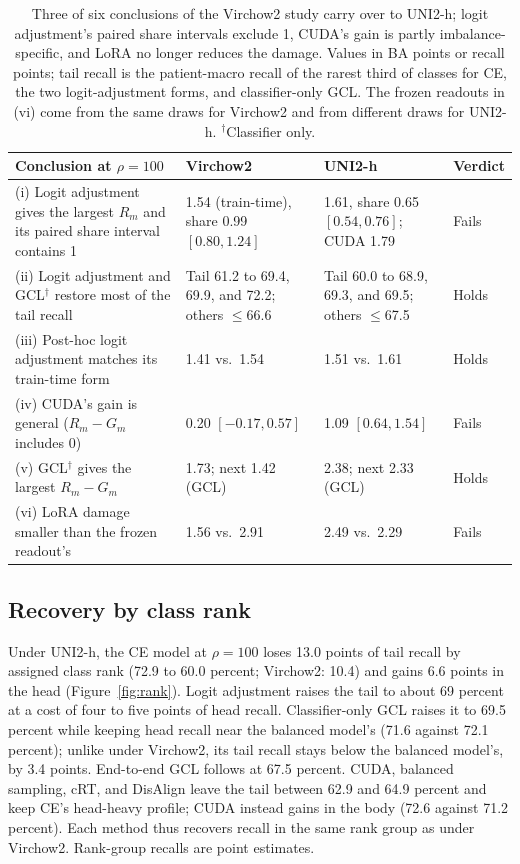 \begin{table}[t]
\centering
\small
\renewcommand{\arraystretch}{1.15}
\begin{tabularx}{\textwidth}{@{}>{\raggedright\arraybackslash}p{}YY>{\raggedright\arraybackslash}p{0.10\textwidth}@{}}
\toprule
Conclusion at $\rho=100$ & Virchow2 & UNI2-h & Verdict \\
\midrule
(i) Logit adjustment gives the largest $R_m$ and its paired share interval contains 1 & 1.54 (train-time), share 0.99 $[0.80, 1.24]$ & 1.61, share 0.65 $[0.54, 0.76]$; CUDA 1.79 & Fails \\
(ii) Logit adjustment and GCL$^{\dagger}$ restore most of the tail recall & Tail 61.2 to 69.4, 69.9, and 72.2; others $\leq$66.6 & Tail 60.0 to 68.9, 69.3, and 69.5; others $\leq$67.5 & Holds \\
(iii) Post-hoc logit adjustment matches its train-time form & 1.41 vs.\ 1.54 & 1.51 vs.\ 1.61 & Holds \\
(iv) CUDA's gain is general ($R_m-G_m$ includes 0) & 0.20 $[-0.17, 0.57]$ & 1.09 $[0.64, 1.54]$ & Fails \\
(v) GCL$^{\dagger}$ gives the largest $R_m-G_m$ & 1.73; next 1.42 (GCL) & 2.38; next 2.33 (GCL) & Holds \\
(vi) LoRA damage smaller than the frozen readout's & 1.56 vs.\ 2.91 & 2.49 vs.\ 2.29 & Fails \\
\bottomrule
\end{tabularx}
\caption{Three of six conclusions of the Virchow2 study carry over to UNI2-h; logit adjustment's paired share intervals exclude 1, CUDA's gain is partly imbalance-specific, and LoRA no longer reduces the damage. Values in BA points or recall points; tail recall is the patient-macro recall of the rarest third of classes for CE, the two logit-adjustment forms, and classifier-only GCL. The frozen readouts in (vi) come from the same draws for Virchow2 and from different draws for UNI2-h. $^{\dagger}$Classifier only.}
\label{tab:claims}
\end{table}

\subsection{Recovery by class rank}
\label{sec:rank}
Under UNI2-h, the CE model at $\rho=100$ loses 13.0 points of tail recall by assigned class rank (72.9 to 60.0 percent; Virchow2: 10.4) and gains 6.6 points in the head (Figure~\ref{fig:rank}). Logit adjustment raises the tail to about 69 percent at a cost of four to five points of head recall. Classifier-only GCL raises it to 69.5 percent while keeping head recall near the balanced model's (71.6 against 72.1 percent); unlike under Virchow2, its tail recall stays below the balanced model's, by 3.4 points. End-to-end GCL follows at 67.5 percent. CUDA, balanced sampling, cRT, and DisAlign leave the tail between 62.9 and 64.9 percent and keep CE's head-heavy profile; CUDA instead gains in the body (72.6 against 71.2 percent). Each method thus recovers recall in the same rank group as under Virchow2. Rank-group recalls are point estimates.


